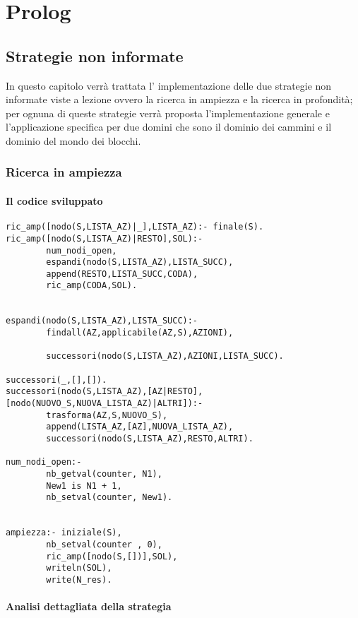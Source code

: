 \part{Prolog}

\chapter{Strategie non informate}
In questo capitolo verrà trattata l' implementazione delle due strategie non informate viste a lezione ovvero la ricerca in ampiezza e la ricerca in profondità; per ognuna di queste strategie verrà proposta l'implementazione generale e l'applicazione specifica per due domini che sono il dominio dei cammini e il dominio del mondo dei blocchi.

\section{Ricerca in ampiezza}

\subsection{Il codice sviluppato}
\begin{lstlisting}
ric_amp([nodo(S,LISTA_AZ)|_],LISTA_AZ):- finale(S).
ric_amp([nodo(S,LISTA_AZ)|RESTO],SOL):-
        num_nodi_open,
        espandi(nodo(S,LISTA_AZ),LISTA_SUCC),
        append(RESTO,LISTA_SUCC,CODA),
        ric_amp(CODA,SOL).


espandi(nodo(S,LISTA_AZ),LISTA_SUCC):-
        findall(AZ,applicabile(AZ,S),AZIONI),

        successori(nodo(S,LISTA_AZ),AZIONI,LISTA_SUCC).

successori(_,[],[]).
successori(nodo(S,LISTA_AZ),[AZ|RESTO],[nodo(NUOVO_S,NUOVA_LISTA_AZ)|ALTRI]):-
        trasforma(AZ,S,NUOVO_S),
        append(LISTA_AZ,[AZ],NUOVA_LISTA_AZ),
        successori(nodo(S,LISTA_AZ),RESTO,ALTRI).

num_nodi_open:-
        nb_getval(counter, N1),
        New1 is N1 + 1,
        nb_setval(counter, New1).


ampiezza:- iniziale(S),
        nb_setval(counter , 0),
        ric_amp([nodo(S,[])],SOL),
        writeln(SOL),
        write(N_res).
\end{lstlisting}

\subsection{Analisi dettagliata della strategia}

